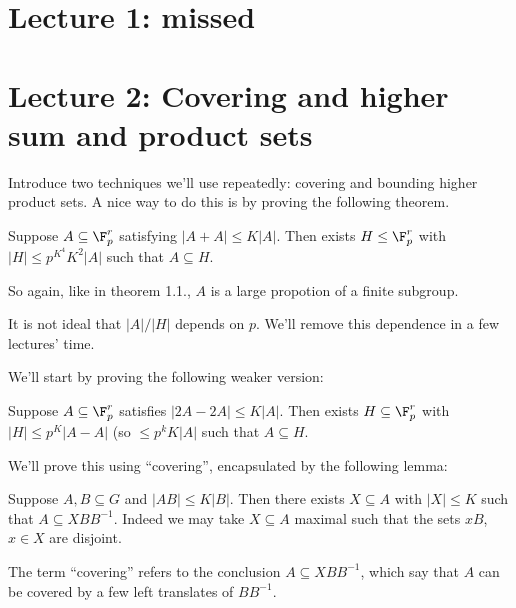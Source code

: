 \documentclass[a4paper]{article}
\begin{document}


\tableofcontents

\section*{Lecture 1: missed}

\clearpage


\section*{Lecture 2: Covering and higher sum and product sets}

Introduce two techniques we'll use repeatedly: covering and bounding higher product sets. A nice way to do this is by proving the following theorem.

\begin{theorem}[Ruzsa]
  Suppose \(A \subseteq \F_p^r\) satisfying \(|A + A| \leq K |A|\). Then exists \(H \leq \F_p^r\) with \(|H| \leq p^{K^4} K^2 |A|\) such that \(A \subseteq H\).
\end{theorem}

So again, like in theorem 1.1., \(A\) is a large propotion of a finite subgroup.

\begin{remark}
  It is not ideal that \(|A|/|H|\) depends on \(p\). We'll remove this dependence in a few lectures' time.
\end{remark}

We'll start by proving the following weaker version:

\begin{proposition}
  Suppose \(A \subseteq \F_p^r\) satisfies \(|2A - 2A| \leq K |A|\). Then exists \(H \subseteq \F_p^r\) with \(|H| \leq p^K|A - A|\) (so \(\leq p^k K|A|\) such that \(A \subseteq H\).
\end{proposition}

We'll prove this using ``covering'', encapsulated by the following lemma:

\begin{lemma}
  Suppose \(A, B \subseteq G\) and \(|AB| \leq K |B|\). Then there exists \(X \subseteq A\) with \(|X| \leq K\) such that \(A \subseteq XBB^{-1}\). Indeed we may take \(X \subseteq A\) maximal such that the sets \(xB\), \(x \in X\) are disjoint.
\end{lemma}

The term ``covering'' refers to the conclusion \(A \subseteq XBB^{-1}\), which say that \(A\) can be covered by a few left translates of \(BB^{-1}\).
\end{document}
